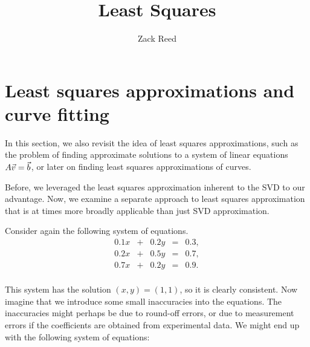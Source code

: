 \documentclass{ximera}
\author{Zack Reed}
\title{Least Squares}
\begin{document}
\begin{abstract}

\end{abstract}
\maketitle


\section*{Least squares approximations and curve fitting}
\label{sec:least-squares}


In this section, we also revisit the idea of least squares approximations, such as the problem of finding approximate
solutions to a system of linear equations $A\vec{v}=\vec{b}$, or later on finding least squares approximations of curves.

Before, we leveraged the least squares approximation inherent to the SVD to our advantage. Now, we examine a separate approach to least squares approximation that is at times more broadly applicable than just SVD approximation.

Consider again the following system
of equations.
\begin{equation*}
  \begin{array}{rcrcl}
    0.1 x &+& 0.2 y &=& 0.3, \\
    0.2 x &+& 0.5 y &=& 0.7, \\
    0.7 x &+& 0.2 y &=& 0.9. \\
  \end{array}
\end{equation*}

This system has the solution $(x,y)=(1,1)$, so it is clearly
consistent. Now imagine that we introduce some small inaccuracies into
the equations. The inaccuracies might perhaps be due to round-off
errors, or due to measurement errors if the coefficients are obtained
from experimental data. We might end up with the following system of
equations:
\end{document}
